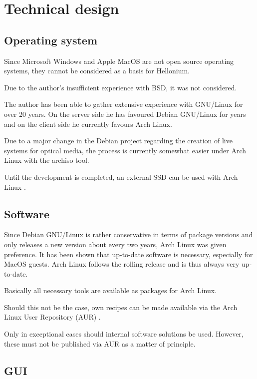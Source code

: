 \chapter{Technical design}
\label{chap:techdesign}

\section{Operating system}

Since Microsoft Windows and Apple MacOS are not open source operating systems, they cannot be considered as a basis for Hellonium.

Due to the author's insufficient experience with BSD, it was not considered.

The author has been able to gather extensive experience with GNU/Linux for over 20 years. On the server side he has favoured Debian GNU/Linux for years and on the client side he currently favours Arch Linux.

Due to a major change in the Debian project regarding the creation of live systems for optical media, the process is currently somewhat easier under Arch Linux with the \glqq{}archiso\grqq{} \cite{Archiso} tool.

Until the development is completed, an external SSD can be used with Arch Linux \cite{ArchLinux}.

\section{Software}

Since Debian GNU/Linux is rather conservative in terms of package versions and only releases a new version about every two years, Arch Linux was given preference. It has been shown that up-to-date software is necessary, especially for MacOS guests. Arch Linux follows the rolling release and is thus always very up-to-date.

Basically all necessary tools are available as packages for Arch Linux.

Should this not be the case, own recipes can be made available via the Arch Linux User Repository (AUR) \cite{AUR}.

Only in exceptional cases should internal software solutions be used. However, these must not be published via AUR as a matter of principle.

\section{GUI}

